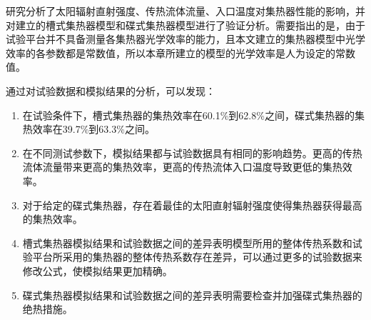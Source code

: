 研究分析了太阳辐射直射强度、传热流体流量、入口温度对集热器性能的影响，并对建立的槽式集热器模型和碟式集热器模型进行了验证分析。需要指出的是，由于试验平台并不具备测量各集热器光学效率的能力，且本文建立的集热器模型中光学效率的各参数都是常数值，所以本章所建立的模型的光学效率是人为设定的常数值。

通过对试验数据和模拟结果的分析，可以发现：

\begin{enumerate}[label=(\arabic*)]
\item 在试验条件下，槽式集热器的集热效率在60.1\%到62.8\%之间，碟式集热器的集热效率在39.7\%到63.3\%之间。
\item 在不同测试参数下，模拟结果都与试验数据具有相同的影响趋势。更高的传热流体流量带来更高的集热效率，更高的传热流体入口温度导致更低的集热效率。
\item 对于给定的碟式集热器，存在着最佳的太阳直射辐射强度使得集热器获得最高的集热效率。
\item 槽式集热器模拟结果和试验数据之间的差异表明模型所用的整体传热系数和试验平台所采用的集热器的整体传热系数存在差异，可以通过更多的试验数据来修改公式，使模拟结果更加精确。
\item 碟式集热器模拟结果和试验数据之间的差异表明需要检查并加强碟式集热器的绝热措施。
\end{enumerate}
